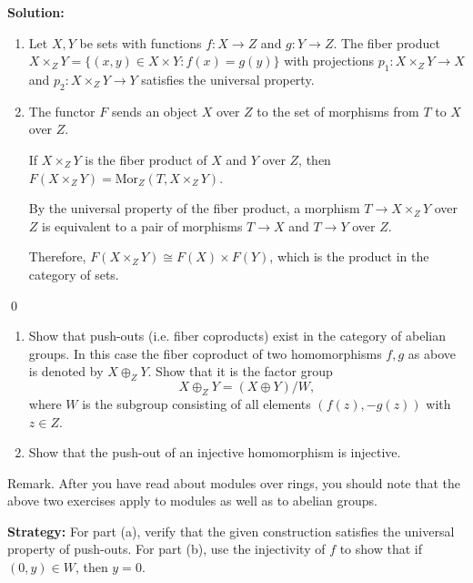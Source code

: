 \noindent\textbf{Solution:}
\begin{enumerate}[label=(\alph*)]
\item Let $X, Y$ be sets with functions $f: X \to Z$ and $g: Y \to Z$. The fiber product $X \times_Z Y = \{(x, y) \in X \times Y : f(x) = g(y)\}$ with projections $p_1: X \times_Z Y \to X$ and $p_2: X \times_Z Y \to Y$ satisfies the universal property.

\item The functor $F$ sends an object $X$ over $Z$ to the set of morphisms from $T$ to $X$ over $Z$.

If $X \times_Z Y$ is the fiber product of $X$ and $Y$ over $Z$, then $F(X \times_Z Y) = \text{Mor}_Z(T, X \times_Z Y)$.

By the universal property of the fiber product, a morphism $T \to X \times_Z Y$ over $Z$ is equivalent to a pair of morphisms $T \to X$ and $T \to Y$ over $Z$.

Therefore, $F(X \times_Z Y) \cong F(X) \times F(Y)$, which is the product in the category of sets.
\end{enumerate}


\qed
\begin{problembox}
\begin{enumerate}[label=(\alph*)]
\item Show that push-outs (i.e. fiber coproducts) exist in the category of abelian groups. In this case the fiber coproduct of two homomorphisms $f, g$ as above is denoted by $X \oplus_Z Y$. Show that it is the factor group
\[X \oplus_Z Y = (X \oplus Y)/W,\]
where $W$ is the subgroup consisting of all elements $(f(z), -g(z))$ with $z \in Z$.
\item Show that the push-out of an injective homomorphism is injective.
\end{enumerate}
Remark. After you have read about modules over rings, you should note that the above two exercises apply to modules as well as to abelian groups.
\end{problembox}

\noindent\textbf{Strategy:} For part (a), verify that the given construction satisfies the universal property of push-outs. For part (b), use the injectivity of $f$ to show that if $(0, y) \in W$, then $y = 0$.

